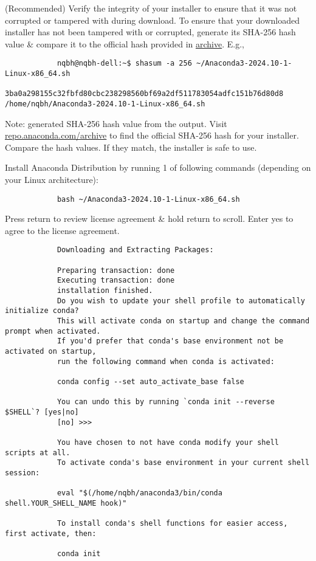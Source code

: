 \documentclass{article}
\begin{document}
\begin{itemize}
\begin{itemize}
		(Recommended) Verify the integrity of your installer to ensure that it was not corrupted or tampered with during download. To ensure that your downloaded installer has not been tampered with or corrupted, generate its SHA-256 hash value \& compare it to the official hash provided in \href{https://repo.anaconda.com/archive/}{archive}. E.g.,
		\begin{verbatim}
			nqbh@nqbh-dell:~$ shasum -a 256 ~/Anaconda3-2024.10-1-Linux-x86_64.sh
			3ba0a298155c32fbfd80cbc238298560bf69a2df511783054adfc151b76d80d8  /home/nqbh/Anaconda3-2024.10-1-Linux-x86_64.sh
		\end{verbatim}
		Note: generated SHA-256 hash value from the output. Visit \url{repo.anaconda.com/archive} to find the official SHA-256 hash for your installer. Compare the hash values. If they match, the installer is safe to use.
		
		Install Anaconda Distribution by running 1 of following commands (depending on your Linux architecture):
		\begin{verbatim}
			bash ~/Anaconda3-2024.10-1-Linux-x86_64.sh
		\end{verbatim}
		Press return to review license agreement \& hold return to scroll. Enter yes to agree to the license agreement.
		\begin{verbatim}
			Downloading and Extracting Packages:
			
			Preparing transaction: done
			Executing transaction: done
			installation finished.
			Do you wish to update your shell profile to automatically initialize conda?
			This will activate conda on startup and change the command prompt when activated.
			If you'd prefer that conda's base environment not be activated on startup,
			run the following command when conda is activated:
			
			conda config --set auto_activate_base false
			
			You can undo this by running `conda init --reverse $SHELL`? [yes|no]
			[no] >>>
			
			You have chosen to not have conda modify your shell scripts at all.
			To activate conda's base environment in your current shell session:
			
			eval "$(/home/nqbh/anaconda3/bin/conda shell.YOUR_SHELL_NAME hook)" 
			
			To install conda's shell functions for easier access, first activate, then:
			
			conda init
			

\end{verbatim}
\end{itemize}
\end{itemize}
\end{document}
